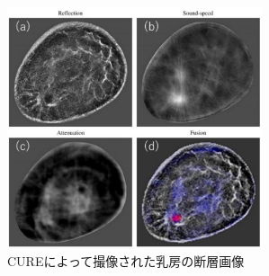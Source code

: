 \begin{figure}[h]
  \begin{center}
    \includegraphics[width=75mm]{fig/curedansou.pdf}
  \end{center}
  \caption{CUREによって撮像された乳房の断層画像}
\end{figure}

